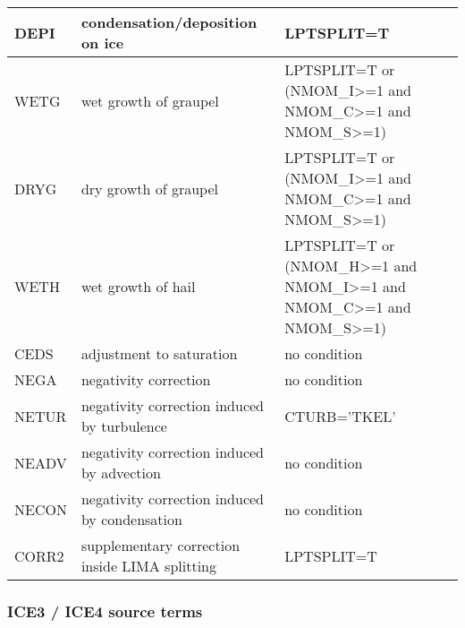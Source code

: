 \begin{longtable} {|p{}|p{}|p{}|}
DEPI   & condensation/deposition on ice                 & LPTSPLIT=T \\\hline
WETG   & wet growth of graupel                          & LPTSPLIT=T or (NMOM\_I>=1 and NMOM\_C>=1 and NMOM\_S>=1) \\\hline
DRYG   & dry growth of graupel                          & LPTSPLIT=T or (NMOM\_I>=1 and NMOM\_C>=1 and NMOM\_S>=1) \\\hline
WETH   & wet growth of hail                             & LPTSPLIT=T or (NMOM\_H>=1 and NMOM\_I>=1 and NMOM\_C>=1 and NMOM\_S>=1) \\\hline
CEDS   & adjustment to saturation                       & no condition \\\hline
NEGA   & negativity correction                          & no condition \\\hline
NETUR  & negativity correction induced by turbulence    & CTURB='TKEL' \\\hline
NEADV  & negativity correction induced by advection     & no condition \\\hline
NECON  & negativity correction induced by condensation  & no condition \\\hline
CORR2  & supplementary correction inside LIMA splitting & LPTSPLIT=T \\\hline
\end{longtable}

\subsubsection{ICE3 / ICE4 source terms}

